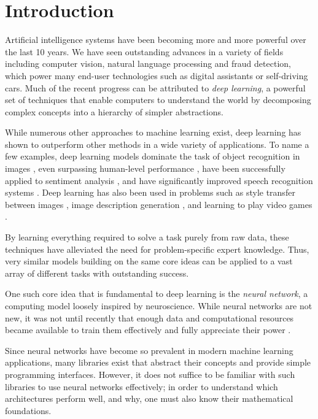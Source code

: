 \section{Introduction}
Artificial intelligence systems have been becoming more and more powerful over the last 10 years. We have seen outstanding advances in a variety of fields including computer vision, natural language processing and fraud detection, which power many end-user technologies such as digital assistants or self-driving cars. Much of the recent progress can be attributed to \textit{deep learning}, a powerful set of techniques that enable computers to understand the world by decomposing complex concepts into a hierarchy of simpler abstractions.

While numerous other approaches to machine learning exist, deep learning has shown to outperform other methods in a wide variety of applications. To name a few examples, deep learning models dominate the task of object recognition in images \cite{DBLP:journals/ijcv/RussakovskyDSKS15}, even surpassing human-level performance \cite{DBLP:conf/iccv/HeZRS15}, have been successfully applied to sentiment analysis \cite{DBLP:conf/sigir/SeverynM15a}, and
have significantly improved speech recognition systems \cite{DBLP:journals/taslp/MohamedDH12}. Deep learning has also been used in problems such as style transfer between images \cite{DBLP:conf/cvpr/GatysEB16}, image description generation \cite{DBLP:journals/pami/KarpathyF17}, and learning to play video games \cite{DBLP:journals/nature/MnihKSRVBGRFOPB15}.

By learning everything required to solve a task purely from raw data, these techniques have alleviated the need for problem-specific expert knowledge. Thus, very similar models building on the same core ideas can be applied to a vast array of different tasks with outstanding success.

One such core idea that is fundamental to deep learning is the \textit{neural network}, a computing model loosely inspired by neuroscience. While neural networks are not new, it was not until recently that enough data and computational resources became available to train them effectively and fully appreciate their power \cite[Ch.\,1,\,pp.\,18-21]{DBLP:books/daglib/0040158}.

Since neural networks have become so prevalent in modern machine learning applications, many libraries exist that abstract their concepts and provide simple programming interfaces. However, it does not suffice to be familiar with such libraries to use neural networks effectively; in order to understand which architectures perform well, and why, one must also know their mathematical foundations.

